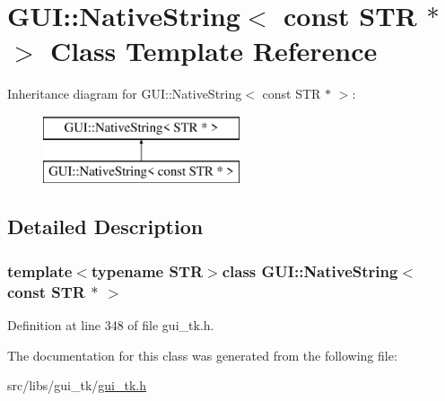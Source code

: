 \hypertarget{classGUI_1_1NativeString_3_01const_01STR_01_5_01_4}{\section{G\-U\-I\-:\-:Native\-String$<$ const S\-T\-R $\ast$ $>$ Class Template Reference}
\label{classGUI_1_1NativeString_3_01const_01STR_01_5_01_4}
}
Inheritance diagram for G\-U\-I\-:\-:Native\-String$<$ const S\-T\-R $\ast$ $>$\-:\begin{figure}[H]
\begin{center}
\leavevmode
\includegraphics[height=2.000000cm]{classGUI_1_1NativeString_3_01const_01STR_01_5_01_4}
\end{center}
\end{figure}


\subsection{Detailed Description}
\subsubsection*{template$<$typename S\-T\-R$>$class G\-U\-I\-::\-Native\-String$<$ const S\-T\-R $\ast$ $>$}



Definition at line 348 of file gui\-\_\-tk.\-h.



The documentation for this class was generated from the following file\-:\begin{DoxyCompactItemize}
\item 
src/libs/gui\-\_\-tk/\hyperlink{gui__tk_8h}{gui\-\_\-tk.\-h}\end{DoxyCompactItemize}
